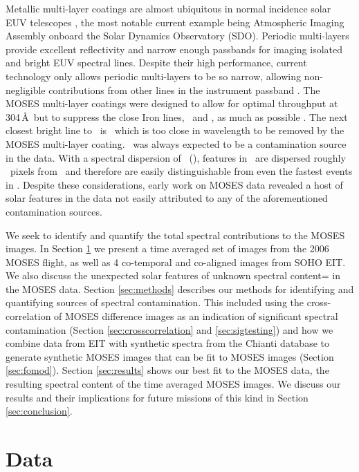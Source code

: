 	Metallic multi-layer coatings are almost ubiquitous in normal incidence solar EUV telescopes \citep{Windt2015}, the most notable current example being Atmospheric Imaging Assembly \citep[AIA:][]{lemen2011} onboard the Solar Dynamics Observatory (SDO).
	Periodic multi-layers provide excellent reflectivity and narrow enough passbands for imaging isolated and bright EUV spectral lines.
	Despite their high performance, current technology only allows periodic multi-layers to be so narrow, allowing non-negligible contributions from other lines in the instrument passband \citep{AIA-Response}.
	The MOSES multi-layer coatings were designed to allow for optimal throughput at 304\,\AA \ but to suppress the close Iron lines, \fexv\ and \fexvi, as much as possible \citep{Owens2005}.
	The next closest bright line to \heii\ is \sixi\, which is too close in wavelength to be removed by the MOSES multi-layer coating.
	\sixi\ was always expected to be a contamination source in the data.
	With a spectral dispersion of \spectdisperspix\ (\spectdispersvel), features in \sixi \ are dispersed roughly \sixipix\ pixels from \heii \ and therefore are easily distinguishable from even the fastest events in \heii.
	Despite these considerations, early work on MOSES data revealed a host of solar features in the data not easily attributed to any of the aforementioned contamination sources.
	
	We seek to identify and quantify the total spectral contributions to the MOSES images.
	In Section \ref{sec:data} we present a time averaged set of images from the 2006 MOSES flight, as well as 4 co-temporal and co-aligned images from SOHO EIT.
	We also discuss the unexpected solar features of unknown spectral content= in the MOSES data.
	Section \ref{sec:methods} describes our methods for identifying and quantifying sources of spectral contamination.  
	This included using the cross-correlation of MOSES difference images as an indication of significant spectral contamination (Section \ref{sec:crosscorrelation} and \ref{sec:sigtesting}) and how we combine data from EIT with synthetic spectra from the Chianti database \citep{ChiantiI,ChiantiX} to generate synthetic MOSES images that can be fit to MOSES images (Section \ref{sec:fomod}).
	Section \ref{sec:results} shows our best fit to the MOSES data, the resulting spectral content of the time averaged MOSES images.
	We discuss our results and their implications for future missions of this kind in Section \ref{sec:conclusion}.   


\section{Data}\label{sec:data}

